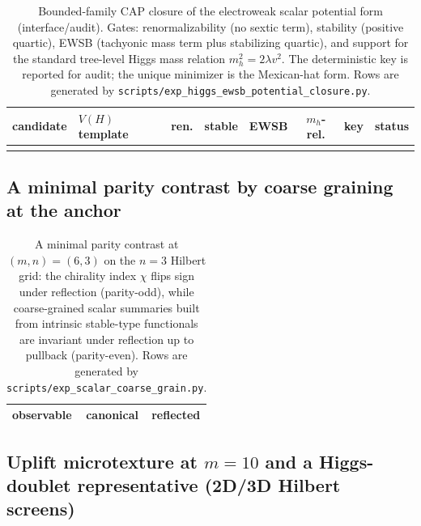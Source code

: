 \begin{table}[t]
\centering
\small
\setlength{\tabcolsep}{6pt}
\renewcommand{\arraystretch}{1.10}
\begin{tabular}{l l c c c c c l}
\toprule
candidate & $V(H)$ template & ren. & stable & EWSB & $m_h$-rel. & key & status \\
\midrule
%
\\
\bottomrule
\end{tabular}
\caption{Bounded-family CAP closure of the electroweak scalar potential form (interface/audit). Gates: renormalizability (no sextic term), stability (positive quartic), EWSB (tachyonic mass term plus stabilizing quartic), and support for the standard tree-level Higgs mass relation $m_h^2=2\lambda v^2$. The deterministic key is reported for audit; the unique minimizer is the Mexican-hat form. Rows are generated by \texttt{scripts/exp\_higgs\_ewsb\_potential\_closure.py}.}
\label{tab:higgs_ewsb_potential_closure}
\end{table}

\subsection{A minimal parity contrast by coarse graining at the anchor}

\begin{table}[t]
\centering
\small
\setlength{\tabcolsep}{8pt}
\renewcommand{\arraystretch}{1.15}
\begin{tabular}{lcc}
\toprule
observable & canonical & reflected \\
\midrule
%
\end{tabular}
\caption{A minimal parity contrast at $(m,n)=(6,3)$ on the $n=3$ Hilbert grid: the chirality index $\chi$ flips sign under reflection (parity-odd), while coarse-grained scalar summaries built from intrinsic stable-type functionals are invariant under reflection up to pullback (parity-even). Rows are generated by \texttt{scripts/exp\_scalar\_coarse\_grain.py}.}
\label{tab:scalar_coarse_grain}
\end{table}

\subsection{Uplift microtexture at \texorpdfstring{$m=10$}{m=10} and a Higgs-doublet representative (2D/3D Hilbert screens)}
\label{subsec:higgs_doublet_uplift_geometry}


